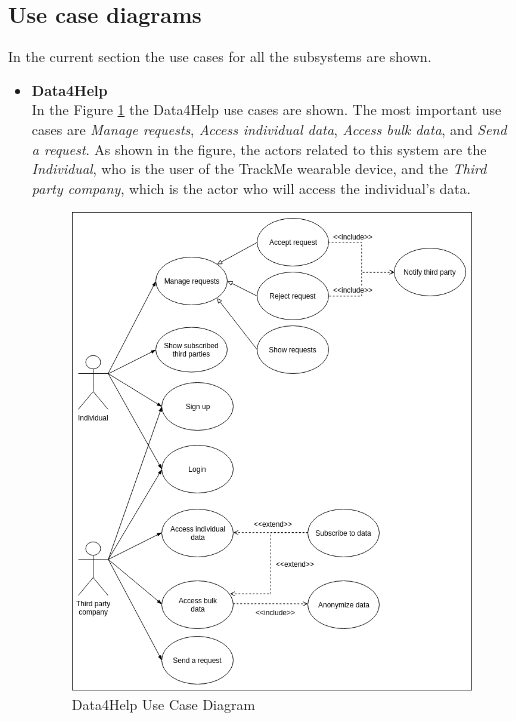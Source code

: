 \documentclass[a4paper, hidelinks, 12pt]{report}
\begin{document}
	\subsection{Use case diagrams}
	In the current section the use cases for all the subsystems are shown.
	
	\begin{itemize}
		\item{\textbf{Data4Help}} \\
		In the Figure \ref{fig:d4h_use_cases} the Data4Help use cases are shown. The most important use cases are \textit{Manage requests}, \textit{Access individual data}, \textit{Access bulk data}, and \textit{Send a request}. As shown in the figure, the actors related to this system are the \textit{Individual}, who is the user of the TrackMe wearable device, and the \textit{Third party company}, which is the actor who will access the individual's data.
		
		\begin{figure}[H]
			\centering
			\includegraphics[scale=0.5]{Diagrams/d4h_use_cases.png}
			\caption[Data4Help use case diagram]{Data4Help Use Case Diagram}
			\label{fig:d4h_use_cases}
		\end{figure}
		

\end{itemize}
\end{document}
